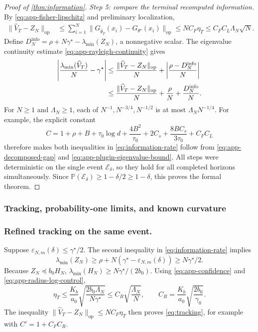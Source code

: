\documentclass[10pt,twoside,letterpaper]{article}
\newcommand{\Prob}{\mathbb P}
\newcommand{\op}{\mathrm{op}}
\newcommand{\norm}[1]{\lVert #1\rVert}
\newcommand{\Vhat}{\widehat V}
\begin{document}
\begin{proof}[Proof of \cref{thm:information}]
\textit{Step 5: compare the terminal recomputed information.}
By \eqref{eq:app-fisher-lipschitz} and preliminary localization,
\begin{align}
\norm{\Vhat_T-Z_N}_{\op}
&\le\sum_{i=1}^N
\norm{G_{\widehat\theta_T}(x_i)-G_{\theta^\star}(x_i)}_{\op}
\le NC_F\eta_T
\le C_FC_L\Lambda_N\sqrt N.
\label{eq:app-initial-tracking}
\end{align}
Define $D_N^{\mathrm{info}}=\rho+N\gamma^\star-\lambda_{\min}(Z_N)$,
a nonnegative scalar. The eigenvalue continuity estimate
\eqref{eq:app-rayleigh-continuity} gives
\begin{align}
\left|\frac{\lambda_{\min}(\Vhat_T)}N-\gamma^\star\right|
&\le\frac{\norm{\Vhat_T-Z_N}_{\op}}N
 +\left|\frac{\rho-D_N^{\mathrm{info}}}{N}\right|\notag\\
&\le\frac{\norm{\Vhat_T-Z_N}_{\op}}N
 +\frac\rho N+\frac{D_N^{\mathrm{info}}}N.
\label{eq:app-plugin-eigenvalue-bound}
\end{align}
For $N\ge1$ and $\Lambda_N\ge1$, each of
$N^{-1},N^{-3/4},N^{-1/2}$ is at most $\Lambda_NN^{-1/4}$.
For example, the explicit constant
\begin{equation}
C=1+\rho+B+\tau_0\log d+\frac{4B^2}{\tau_0}
 +2C_s+\frac{8BC_s}{3\tau_0}+C_FC_L
\label{eq:app-main-constant}
\end{equation}
therefore makes both inequalities in \eqref{eq:information-rate}
follow from \eqref{eq:app-decomposed-gap} and
\eqref{eq:app-plugin-eigenvalue-bound}.
All steps were deterministic on the single event $\mathcal E_\delta$,
so they hold for all completed horizons simultaneously. Since
$\Prob(\mathcal E_\delta)\ge1-\delta/2\ge1-\delta$, this proves the
formal theorem.
\end{proof}

\subsubsection{Tracking, probability-one limits, and known curvature}

\subsubsection*{Refined tracking on the same event.}
Suppose $\varepsilon_{N,m}(\delta)\le\gamma^\star/2$.
The second inequality in \eqref{eq:information-rate} implies
\begin{equation}
\lambda_{\min}(Z_N)
\ge\rho+N(\gamma^\star-\varepsilon_{N,m}(\delta))
\ge N\gamma^\star/2.
\label{eq:app-refined-information}
\end{equation}
Because $Z_N\preceq b_0H_N$,
$\lambda_{\min}(H_N)\ge N\gamma^\star/(2b_0)$.
Using \eqref{eq:app-confidence} and
\eqref{eq:app-radius-log-control},
\begin{equation}
\eta_T\le\frac{K_b}{a_0}
\sqrt{\frac{2b_0\Lambda_N}{N\gamma^\star}}
\le C_R\sqrt{\frac{\Lambda_N}{N}},\qquad
C_R=\frac{K_b}{a_0}\sqrt{\frac{2b_0}{\gamma_0}}.
\label{eq:app-refined-localization}
\end{equation}
The inequality $\norm{\Vhat_T-Z_N}_{\op}\le NC_F\eta_T$ then proves
\eqref{eq:tracking}, for example with $C'=1+C_FC_R$.
\end{document}
